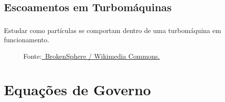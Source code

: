 \documentclass{beamer}
\begin{document}
\subsection{Escoamentos em Turbomáquinas}
\begin{frame}
  \frametitle{\subsecname}
  
  \begin{block}{}
    Estudar como partículas se comportam dentro de uma turbomáquina em funcionamento.
  \end{block}
  
  \begin{figure}
     {\raggedleft \tiny Fonte:\href{https://commons.wikimedia.org/wiki/File:Washing_machine_agitator.JPG}
      {\textcopyright \ BrokenSphere / Wikimedia Commons.}}
  \end{figure}
  
\end{frame}

\section{Equações de Governo}
\end{document}
